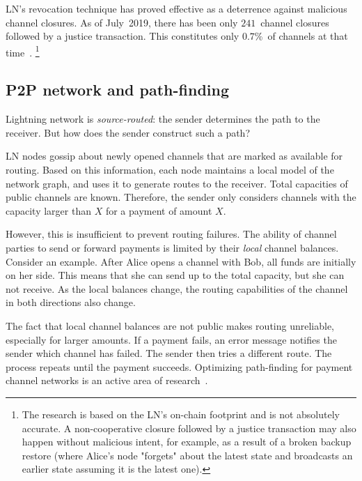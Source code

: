 LN's revocation technique has proved effective as a deterrence against malicious channel closures.
As of July~2019, there has been only $241$~channel closures followed by a justice transaction.
This constitutes only $0.7$\%~of channels at that time~\cite{BitMEXLN3}.
\footnote{The research is based on the LN's on-chain footprint and is not absolutely accurate. A non-cooperative closure followed by a justice transaction may also happen without malicious intent, for example, as a result of a broken backup restore (where Alice's node "forgets" about the latest state and broadcasts an earlier state assuming it is the latest one).}


\subsection{P2P network and path-finding}

Lightning network is \textit{source-routed}: the sender determines the path to the receiver.
But how does the sender construct such a path?

LN nodes gossip about newly opened channels that are marked as available for routing.
Based on this information, each node maintains a local model of the network graph, and uses it to generate routes to the receiver.
Total capacities of public channels are known.
Therefore, the sender only considers channels with the capacity larger than $X$ for a payment of amount $X$.

However, this is insufficient to prevent routing failures.
The ability of channel parties to send or forward payments is limited by their \textit{local} channel balances.
Consider an example.
After Alice opens a channel with Bob, all funds are initially on her side.
This means that she can send up to the total capacity, but she can not receive.
As the local balances change, the routing capabilities of the channel in both directions also change.

The fact that local channel balances are not public makes routing unreliable, especially for larger amounts.
If a payment fails, an error message notifies the sender which channel has failed.
The sender then tries a different route.
The process repeats until the payment succeeds.
Optimizing path-finding for payment channel networks is an active area of research~\cite{Pickhardt2019a, Prihodko2016, Grunspan2018, Pickhardt2019, Piatkivskyi2018, Sivaraman2018, Bagaria2019, Roos2018}.
